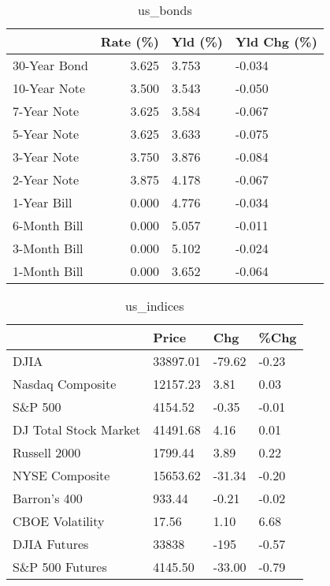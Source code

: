 \documentclass{article}%
\begin{document}
\begin{table}[htbp]%
\caption{us\_bonds}%
\centering%
\begin{adjustbox}{width=1\textwidth}%
\begin{tabular}{lrll}
\toprule
             &  Rate (\%) & Yld (\%) & Yld Chg (\%) \\
\midrule
30-Year Bond &     3.625 &   3.753 &      -0.034 \\
10-Year Note &     3.500 &   3.543 &      -0.050 \\
 7-Year Note &     3.625 &   3.584 &      -0.067 \\
 5-Year Note &     3.625 &   3.633 &      -0.075 \\
 3-Year Note &     3.750 &   3.876 &      -0.084 \\
 2-Year Note &     3.875 &   4.178 &      -0.067 \\
 1-Year Bill &     0.000 &   4.776 &      -0.034 \\
6-Month Bill &     0.000 &   5.057 &      -0.011 \\
3-Month Bill &     0.000 &   5.102 &      -0.024 \\
1-Month Bill &     0.000 &   3.652 &      -0.064 \\
\bottomrule
\end{tabular}
%
\end{adjustbox}%
\end{table}

%


\begin{table}[htbp]%
\caption{us\_indices}%
\centering%
\begin{adjustbox}{width=1\textwidth}%
\begin{tabular}{llll}
\toprule
                      &    Price &    Chg &  \%Chg \\
\midrule
                 DJIA & 33897.01 & -79.62 & -0.23 \\
     Nasdaq Composite & 12157.23 &   3.81 &  0.03 \\
              S\&P 500 &  4154.52 &  -0.35 & -0.01 \\
DJ Total Stock Market & 41491.68 &   4.16 &  0.01 \\
         Russell 2000 &  1799.44 &   3.89 &  0.22 \\
       NYSE Composite & 15653.62 & -31.34 & -0.20 \\
         Barron's 400 &   933.44 &  -0.21 & -0.02 \\
      CBOE Volatility &    17.56 &   1.10 &  6.68 \\
         DJIA Futures &    33838 &   -195 & -0.57 \\
      S\&P 500 Futures &  4145.50 & -33.00 & -0.79 \\
\bottomrule
\end{tabular}
%
\end{adjustbox}%
\end{table}
\end{document}
